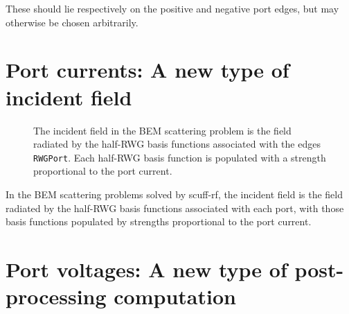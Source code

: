 \documentclass[letterpaper]{article}
\begin{document}
These should lie respectively on the positive and 
negative port edges, but may otherwise be chosen
arbitrarily.

\newpage

\section{Port currents: A new type of incident field}
\label{PortCurrentSection}

\begin{figure}
\begin{center}
\caption{The incident field in the BEM scattering problem
         is the field radiated by the half-RWG basis functions
         associated with the edges \texttt{RWGPort}.
         Each half-RWG basis function is populated with
         a strength proportional to the port current.
        }
\label{RWGPortFigure}
\end{center}
\end{figure}

In the BEM scattering problems solved by {\sc scuff-rf}, the incident
field is the field radiated by the half-RWG basis functions associated 
with each port, with those basis functions populated by strengths
proportional to the port current.

\newpage
\section{Port voltages: A new type of post-processing computation}
\label{PortVoltageSection}
\end{document}
